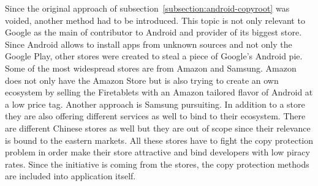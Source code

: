 Since the original approach of subsection~\ref{subsection:android-copyroot} was voided, another method had to be introduced.
This topic is not only relevant to Google as the main of contributor to Android and provider of its biggest store.
Since Android allows to install apps from unknown sources and not only the Google Play, other stores were created to steal a piece of Google's Android pie.
Some of the most widespread stores are from Amazon and Samsung.
Amazon does not only have the Amazon Store but is also trying to create an own ecosystem by selling the Firetablets with an Amazon tailored flavor of Android at a low price tag.
Another approach is Samsung pursuiting. In addition to a store they are also offering different services as well to bind to their ecosystem.
There are different Chinese stores as well but they are out of scope since their relevance is bound to the eastern markets.
\newline
All these stores have to fight the copy protection problem in order make their store attractive and bind developers with low piracy rates.
Since the initiative is coming from the stores, the copy protection methods are included into application itself. \cite{munteanLicense}
